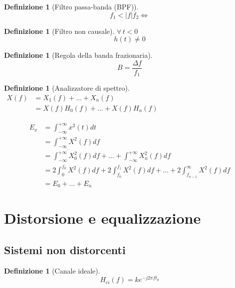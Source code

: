 \documentclass[a4paper,10pt]{article}
\theoremstyle{mystyle}
\newtheorem{definition}[theorem]{Definizione}
\begin{document}
\begin{definition}[Filtro passa-banda (BPF)]
    \[
        f_1 < \lvert f \rvert f_2 \Leftrightarrow
    \]
\end{definition}

\begin{definition}[Filtro non causale]
    \(\forall \, t<0\)
    \[
        h(t) \neq 0
    \]    
\end{definition}

\begin{definition}[Regola della banda frazionaria]
    \[B=\frac{\Delta f}{f_1}\]
\end{definition}

\begin{definition}[Analizzatore di spettro]
    \(
        \begin{aligned}
            X(f)
            &= X_1 (f) + \ldots + X_n (f)   \\
            &= X(f) H_0 (f) + \ldots + X(f) H_n (f)
        \end{aligned}
    \)

    \[
        \begin{aligned}
            E_x 
            &= \int_{-\infty}^{+\infty} x^2 (t) dt \\
            &= \int_{-\infty}^{+\infty} X^2 (f) df \\
            &=\int_{-\infty}^{+\infty} X_0^2 (f) df + \ldots + \int_{-\infty}^{+\infty} X_n^2 (f) df \\
            &=2\int_{0}^{f_0} X^2 (f) df + 2 \int_{f_0}^{f_1} X^2(f) df + \ldots + 2 \int_{f_{n-1}}^{\infty} X^2 (f) df \\
            &= E_0 + \ldots + E_n
        \end{aligned}
    \]
\end{definition}


\newpage

\section{Distorsione e equalizzazione}

\subsection{Sistemi non distorcenti}
\begin{definition}[Canale ideale]
    \[H_{ci}(f) = k e^{-j 2 \pi f t_0}\]
\end{definition}
\end{document}
